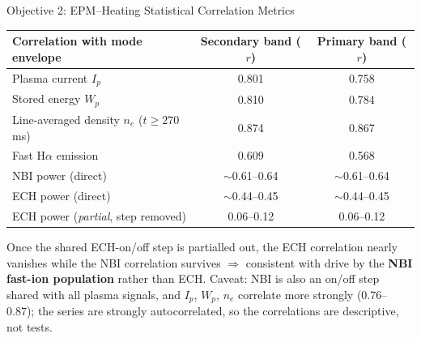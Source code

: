 \documentclass[aspectratio=169]{beamer}
\begin{document}
\begin{frame}{Objective 2: EPM--Heating Statistical Correlation Metrics}
    \small
    \begin{center}
    \begin{tabular}{lcc}
        \toprule
        Correlation with mode envelope & Secondary band ($r$) & Primary band ($r$) \\
        \midrule
        Plasma current $I_p$        & 0.801 & 0.758 \\
        Stored energy $W_p$         & 0.810 & 0.784 \\
        Line-averaged density $n_e$ ($t\ge270$\,ms) & 0.874 & 0.867 \\
        Fast H$\alpha$ emission     & 0.609 & 0.568 \\
        \midrule
        NBI power (direct)          & $\sim$0.61--0.64 & $\sim$0.61--0.64 \\
        ECH power (direct)          & $\sim$0.44--0.45 & $\sim$0.44--0.45 \\
        ECH power (\emph{partial}, step removed) & 0.06--0.12 & 0.06--0.12 \\
        \bottomrule
    \end{tabular}
    \end{center}
    \vspace{0.3cm}
    \normalsize
    Once the shared ECH-on/off step is partialled out, the ECH correlation nearly
    vanishes while the NBI correlation survives $\Rightarrow$ consistent with
    drive by the \textbf{NBI fast-ion population} rather than ECH. Caveat: NBI
    is also an on/off step shared with all plasma signals, and $I_p$, $W_p$,
    $n_e$ correlate more strongly (0.76--0.87); the series are strongly
    autocorrelated, so the correlations are descriptive, not tests.
\end{frame}
\end{document}
